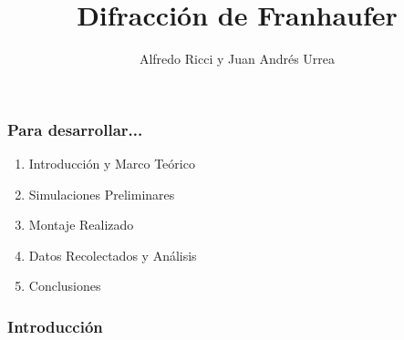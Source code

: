 \documentclass[12pt]{beamer}
\title{Difracción de Franhaufer}
\author{Alfredo Ricci y Juan Andrés Urrea}
\begin{document}
\frame{\titlepage}
\begin{frame}
\frametitle{Para desarrollar...}
\begin{block}{}
\begin{enumerate}
\item Introducción y Marco Teórico
\item Simulaciones Preliminares
\item Montaje Realizado
\item Datos Recolectados y Análisis
\item Conclusiones
\end{enumerate}
\end{block}
\end{frame}

\begin{frame}
\frametitle{Introducción}
\end{frame}
\end{document}
